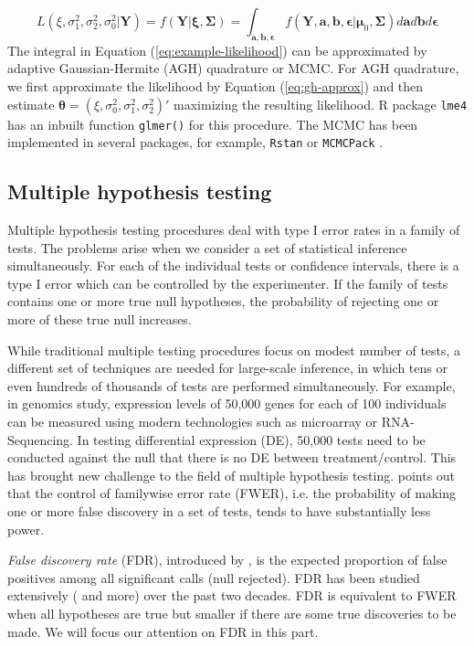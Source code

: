 \begin{equation}\label{eq:example-likelihood}
L(\xi, \sigma_1^2, \sigma_2^2, \sigma_0^2|\bm Y)=f(\bm Y|\bm \xi, \bm \Sigma)=
\int_{\bm{a,b,\epsilon}} f(\bm Y, \bm a, \bm b, \bm \epsilon |\bm \mu_0, \bm \Sigma)d\bm a d \bm b
d\bm \epsilon 
\end{equation}
The integral in Equation (\ref{eq:example-likelihood}) can be approximated by adaptive
Gaussian-Hermite (AGH) quadrature or MCMC. For AGH quadrature, we first approximate the likelihood
by Equation (\ref{eq:gh-approx}) and then estimate $\bm\theta = (\xi, \sigma_0^2, \sigma_1^2,
\sigma_2^2)'$ maximizing the resulting likelihood. R package \verb"lme4" \citep{bates2012lme4} has
an inbuilt function \verb"glmer()" for this procedure. The MCMC has been implemented in several
packages, for example, \verb|Rstan| \citep{Rstan} or \verb|MCMCPack| \citep{martin2011mcmcpack}. 

\subsection{Multiple hypothesis testing}
Multiple hypothesis testing procedures deal with type I error rates in a family of tests. The
problems arise when we consider a set of statistical inference simultaneously.  For each of the
individual tests or confidence intervals, there is a type I error which can be controlled by the
experimenter.  If the family of tests contains one or more true null hypotheses, the probability of
rejecting one or more of these true null increases. 

While traditional multiple testing procedures focus on modest number of tests, a different set of
techniques are needed for large-scale inference, in which tens or even hundreds of thousands of
tests are performed simultaneously. For example, in genomics study, expression levels of 50,000
genes for each of 100 individuals can be measured using modern technologies such as microarray or
RNA-Sequencing. In testing differential expression (DE), 50,000 tests need to be conducted against
the null that there is no DE between treatment/control. This has brought new challenge to the field
of multiple hypothesis testing. \cite{benjamini1995controlling} points out that the control of
familywise error rate (FWER), i.e. the probability of making one or more false discovery in a set
of
tests, tends to have substantially less power. 

\textit{False discovery rate} (FDR), introduced by \cite{benjamini1995controlling}, is the expected
proportion of false positives among all significant calls (null rejected). FDR has been studied
extensively (\cite{benjamini2001control,efron2004large,efron2010large,storey2003statistical} and
more) over the past two decades.  FDR is equivalent to FWER \citep{benjamini1995controlling} when
all hypotheses are true but smaller if there are some true discoveries to be made. We will focus
our
attention on FDR in this part. 

